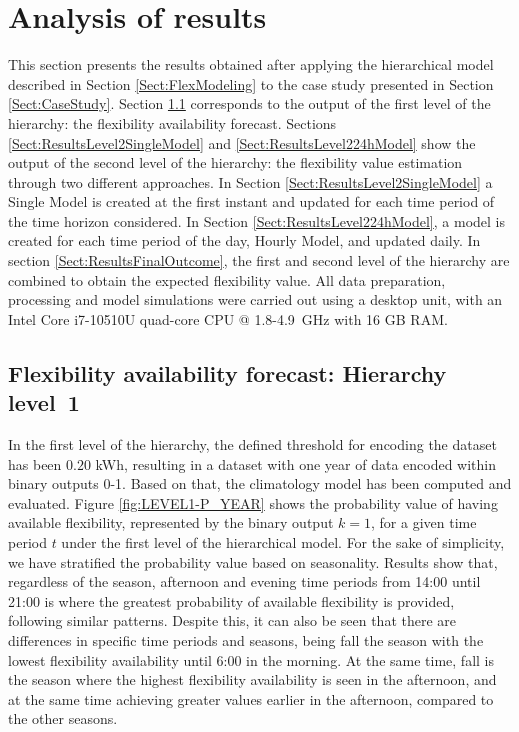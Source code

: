 \section{Analysis of results} \label{sect:Results} 
This section presents the results obtained after applying the hierarchical model described in Section \ref{Sect:FlexModeling} to the case study presented in Section \ref{Sect:CaseStudy}. Section \ref{Sect:ResultsLevel1} corresponds to the output of the first level of the hierarchy: the flexibility availability forecast. Sections \ref{Sect:ResultsLevel2SingleModel} and \ref{Sect:ResultsLevel224hModel} show the output of the second level of the hierarchy: the flexibility value estimation through two different approaches. In Section \ref{Sect:ResultsLevel2SingleModel} a Single Model is created at the first instant and updated for each time period of the time horizon considered. In Section \ref{Sect:ResultsLevel224hModel}, a model is created for each time period of the day, Hourly Model, and updated daily. In section \ref{Sect:ResultsFinalOutcome}, the first and second level of the hierarchy are combined to obtain the expected flexibility value. All data preparation, processing and model simulations were carried out using a desktop unit, with an Intel Core i7-10510U quad-core CPU @  1.8-4.9~GHz with 16 GB RAM.

\subsection{Flexibility availability forecast: Hierarchy level~1} \label{Sect:ResultsLevel1}
In the first level of the hierarchy, the defined threshold for encoding the dataset has been $0.20$ kWh, resulting in a dataset with one year of data encoded within binary outputs 0-1. Based on that, the climatology model has been computed and evaluated. 
Figure \ref{fig:LEVEL1-P_YEAR} shows the probability value of having available flexibility, represented by the binary output $k=1$, for a given time period $t$ under the first level of the hierarchical model. For the sake of simplicity, we have stratified the probability value based on seasonality. Results show that, regardless of the season, afternoon and evening time periods from 14:00 until 21:00 is where the greatest probability of available flexibility is provided, following similar patterns. Despite this, it can also be seen that there are differences in specific time periods and seasons, being fall the season with the lowest flexibility availability until 6:00 in the morning. At the same time, fall is the season where the highest flexibility availability is seen in the afternoon, and at the same time achieving greater values earlier in the afternoon, compared to the other seasons.   

